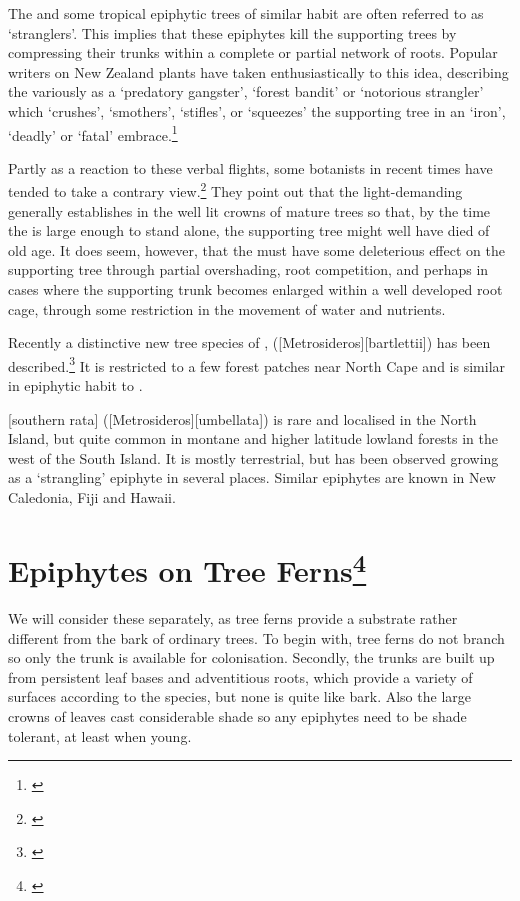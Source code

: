 The  and some tropical epiphytic trees of similar habit are often referred to as `stranglers'.
This implies that these epiphytes kill the supporting trees by compressing their trunks within a complete or partial network of roots.
Popular writers on New Zealand plants have taken enthusiastically to this idea, describing the  variously as a `predatory gangster', `forest bandit' or `notorious strangler' which `crushes', `smothers', `stifles', or `squeezes' the supporting tree in an `iron', `deadly' or `fatal' embrace.\footnote{\cite{druce1971uncle}}

Partly as a reaction to these verbal flights, some botanists in recent times have tended to take a contrary view.\footnote{\cite{zotov1948rata}}
They point out that the light-demanding  generally establishes in the well lit crowns of mature trees so that, by the time the  is large enough to stand alone, the supporting tree might well have died of old age.
It does seem, however, that the  must have some deleterious effect on the supporting tree through partial overshading, root competition, and perhaps in cases where the supporting trunk becomes enlarged within a well developed  root cage, through some restriction in the movement of water and nutrients.

Recently a distinctive new tree species of ,  ([Metrosideros][bartlettii]) has been described.\footnote{\cite{dawson1985metrosideros}}
It is restricted to a few forest patches near North Cape and is similar in epiphytic habit to .

[southern rata] ([Metrosideros][umbellata]) is rare and localised in the North Island, but quite common in montane and higher latitude lowland forests in the west of the South Island.
It is mostly terrestrial, but has been observed growing as a `strangling' epiphyte in several places.
Similar  epiphytes are known in New Caledonia, Fiji and Hawai{\okina}i.

\section[Epiphytes on Tree Ferns]{Epiphytes on Tree Ferns\thinspace\footnote{\cite{pope1924role}}}

We will consider these separately, as tree ferns provide a substrate rather different from the bark of ordinary trees.
To begin with, tree ferns do not branch so only the trunk is available for colonisation.
Secondly, the trunks are built up from persistent leaf bases and adventitious roots, which provide a variety of surfaces according to the species, but none is quite like bark.
Also the large crowns of leaves cast considerable shade so any epiphytes need to be shade tolerant, at least when young.

